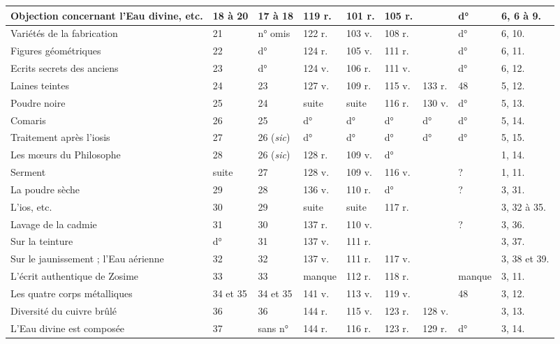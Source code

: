 \documentclass[a4paper, 11pt, oneside, polutonikogreek, french]{article}
\begin{document}
\begin{landscape}
\begin{table}[H]
\begin{tabular}{|p{20mm}|l|l|l|l|l|l|l|p{20mm}|}
        Objection concernant l'Eau divine, etc. & 18 à 20 & 17 à 18 & 119 r. & 101 r. & 105 r. & ~ & d° & 6, 6 à 9. \\ \hline
        Variétés de la fabrication & 21 & n° omis & 122 r. & 103 v. & 108 r. & ~ & d° & 6, 10. \\ \hline
        Figures géométriques & 22 & d° & 124 r. & 105 v. & 111 r. & ~ & d° & 6, 11. \\ \hline
        Ecrits secrets des anciens & 23 & d° & 124 v. & 106 r. & 111 v. & ~ & d° & 6, 12. \\ \hline
        Laines teintes & 24 & 23 & 127 v. & 109 r. & 115 v. & 133 r. & 48 & 5, 12. \\ \hline
        Poudre noire & 25 & 24 & suite & suite & 116 r. & 130 v. & d° & 5, 13. \\ \hline
        Comaris & 26 & 25 & d° & d° & d° & d° & d° & 5, 14. \\ \hline
        Traitement après l'iosis & 27 & 26 (\emph{sic}) & d° & d° & d° & d° & d° & 5, 15. \\ \hline
        Les mœurs du Philosophe & 28 & 26 (\emph{sic}) & 128 r. & 109 v. & d° & ~ & ~ & 1, 14. \\ \hline
        Serment & suite & 27 & 128 v. & 109 v. & 116 v. & ~ & ? & 1, 11. \\ \hline
        La poudre sèche & 29 & 28 & 136 v. & 110 r. & d° & ~ & ? & 3, 31. \\ \hline
        L'ios, etc. & 30 & 29 & suite & suite & 117 r. & ~ & ~ & 3, 32 à 35. \\ \hline
        Lavage de la cadmie & 31 & 30 & 137 r. & 110 v. & ~ & ~ & ? & 3, 36. \\ \hline
        Sur la teinture & d° & 31 & 137 v. & 111 r. & ~ & ~ & ~ & 3, 37. \\ \hline
        Sur le jaunissement ; l'Eau aérienne & 32 & 32 & 137 v. & 111 r. & 117 v. & ~ & ~ & 3, 38 et 39. \\ \hline
        L'écrit authentique de Zosime & 33 & 33 & manque & 112 r. & 118 r. & ~ & manque & 3, 11. \\ \hline
        Les quatre corps métalliques & 34 et 35 & 34 et 35 & 141 v. & 113 v. & 119 v. & ~ & 48 & 3, 12. \\ \hline
        Diversité du cuivre brûlé & 36 & 36 & 144 r. & 115 v. & 123 r. & 128 v. & ~ & 3, 13. \\ \hline
        L'Eau divine est composée & 37 & sans n° & 144 r. & 116 r. & 123 r. & 129 r. & d° & 3, 14. \\ \hline

\end{tabular}
\end{table}
\end{landscape}
\end{document}
